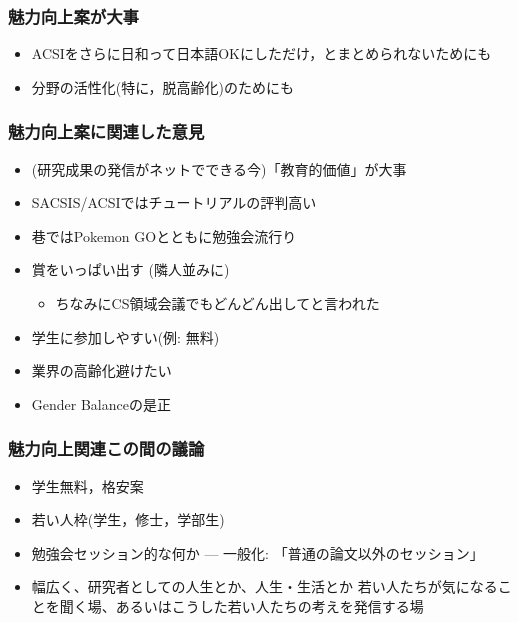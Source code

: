 \documentclass[12pt,dvipdfmx]{beamer}
\begin{document}
\begin{frame}
\frametitle{魅力向上案が大事}

\begin{itemize}
\item ACSIをさらに日和って日本語OKにしただけ，とまとめられないためにも
\item 分野の活性化(特に，脱高齢化)のためにも
\end{itemize}

\end{frame}

\begin{frame}
\frametitle{魅力向上案に関連した意見}

\begin{itemize}
\item (研究成果の発信がネットでできる今)「教育的価値」が大事

\item SACSIS/ACSIではチュートリアルの評判高い

\item 巷ではPokemon GOとともに勉強会流行り

\item 賞をいっぱい出す (隣人並みに)
  \begin{itemize}
  \item ちなみにCS領域会議でもどんどん出してと言われた
  \end{itemize}

\item 学生に参加しやすい(例: 無料)

\item 業界の高齢化避けたい

\item Gender Balanceの是正
\end{itemize}
\end{frame}

\begin{frame}
\frametitle{魅力向上関連この間の議論}

\begin{itemize}
\item 学生無料，格安案
\item 若い人枠(学生，修士，学部生)
\item 勉強会セッション的な何か --- 一般化: 「普通の論文以外のセッション」
\item 幅広く、研究者としての人生とか、人生・生活とか
若い人たちが気になることを聞く場、あるいはこうした若い人たちの考えを発信する場
\end{itemize}
\end{frame}
\end{document}
